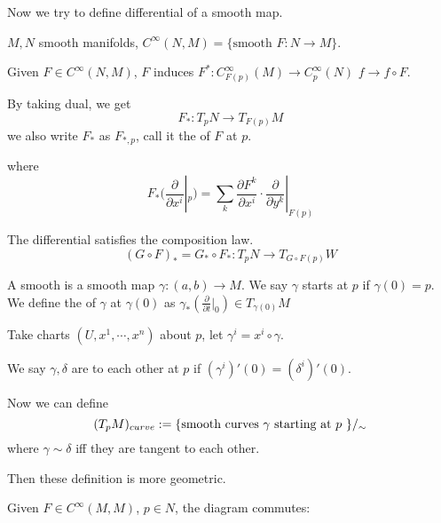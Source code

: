Now we try to define differential of a smooth map.

 $ M,N  $ smooth manifolds,  $ C^\infty(N,M)=\{\text{smooth } F:N\rightarrow M\} $.
 
 Given  $ F\in C^\infty(N,M) $,  $ F  $ induces  $ F^*:C^\infty_{F(p)}(M)\rightarrow C^\infty_p(N) $ $ f\rightarrow f\circ F $.
 
 By taking dual, we get 
 \[F_*:T_pN\rightarrow T_{F(p)}M\]    
 we also write  $ F_*  $ as  $ F_{*,p} $, call it the  of  $ F $ at  $ p $. 
 
 where 
 \[F_*(\frac{\partial }{\partial x^i}|_p)=\sum\limits_{k}\frac{\partial F^k}{\partial x^i}\cdot \frac{\partial }{\partial y^k}|_{F(p)}\]
 \begin{proposition}
    The differential satisfies the composition law.
    \[(G\circ F)_*=G_*\circ F_*:T_pN\rightarrow T_{G\circ F(p)}W\]
 \end{proposition}
 \begin{definition}
    A smooth  is a smooth map  $ \gamma:(a,b)\rightarrow M $. We say  $ \gamma  $ starts at  $ p  $ if  $ \gamma(0)=p $. We define the  of  $ \gamma  $ at  $ \gamma(0) $ as  $ \gamma_*(\frac{\partial}{\partial t}|_0)\in T_{\gamma(0)}M $
    
    Take charts  $ (U,x^1,\cdots,x^n) $ about  $ p  $, let  $ \gamma^i=x^i\circ \gamma $.
    
    We say  $ \gamma, \delta $ are  to each other at  $ p  $ if  $ (\gamma^i)'(0)=(\delta^i)'(0) $.       
 \end{definition}
 Now we can define 
 \[(T_pM)_{curve}:=\{\text{smooth curves  $ \gamma  $ starting at  $ p  $ }\}/_\sim\]
 where  $ \gamma\sim \delta  $ iff they are tangent to each other.
 
 Then these definition is more geometric.
 
 \begin{lemma}
    Given  $ F\in C^\infty(M,M) $,  $ p\in N $, the diagram commutes:
    \begin{center}
    \end{center}
 
 \end{lemma}
